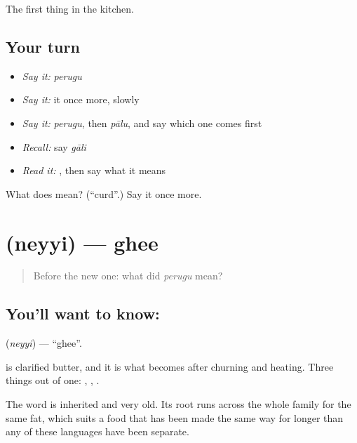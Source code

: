 \begin{grammarlens}[title={What you've built}]
The first thing in the kitchen.
\end{grammarlens}

\subsection*{Your turn}
\begin{itemize}
\raggedright
  \item \emph{Say it:} \emph{perugu}
  \item \emph{Say it:} it once more, slowly
  \item \emph{Say it:} \emph{perugu}, then \emph{pālu}, and say which one comes first
  \item \emph{Recall:} say \emph{gāli}
  \item \emph{Read it:} \textbf{}, then say what it means
\end{itemize}

\begin{tcolorbox}[breakable,colback=teal!4,colframe=teal!35!black,title={Before you move on}]
What does  mean? (\textquotedblleft{}curd\textquotedblright{}.) Say it once more.
\end{tcolorbox}
\section[\texorpdfstring{\te{నెయ్యి} (neyyi)}{నెయ్యి (neyyi)}]{ (neyyi) — ghee}

\label{lesson:TE-C61-ghee}



\begin{quote}
Before the new one: what did \emph{perugu} mean?
\end{quote}

\subsection*{You'll want to know: }
\textbf{} (\emph{neyyi}) — \textquotedblleft{}ghee\textquotedblright{}.

 is clarified butter, and it is what  becomes after churning and heating. Three things out of one: , , .

The word is inherited and very old. Its root runs across the whole family for the same fat, which suits a food that has been made the same way for longer than any of these languages have been separate.


